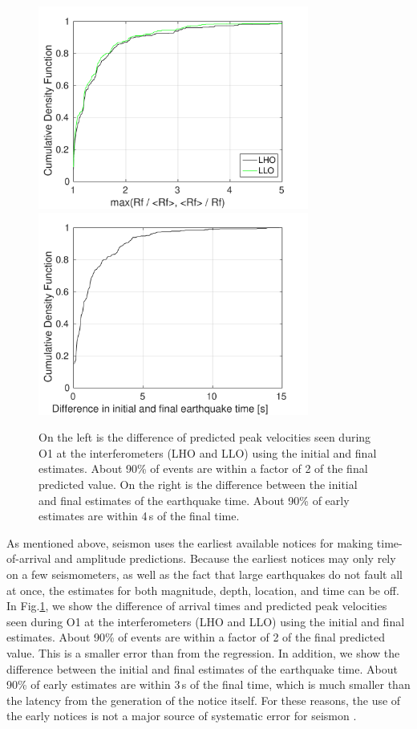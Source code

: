 \documentclass[reprint, prl, aps, showpacs]{revtex4-1}
\newcommand{\seismon}{\textnormal{seismon }}
\begin{document}
\begin{figure}[t]
\hspace*{-0.5cm}
 \includegraphics[width=3.5in]{initial_vs_final.pdf}
 \includegraphics[width=3.5in]{lockloss_est_timediff.pdf}
 \caption{On the left is the difference of predicted peak velocities seen during O1 at the interferometers (LHO and LLO) using the initial and final estimates. About 90\% of events are within a factor of 2 of the final predicted value. On the right is the difference between the initial and final estimates of the earthquake time. About 90\% of early estimates are within 4\,s of the final time.}
 \label{fig:initialvsfinal}
\end{figure}

As mentioned above, \seismon uses the earliest available notices for making time-of-arrival and amplitude predictions.
Because the earliest notices may only rely on a few seismometers, as well as the fact that large earthquakes do not fault all at once, the estimates for both magnitude, depth, location, and time can be off.
In Fig.\ref{fig:initialvsfinal}, we show the difference of arrival times and predicted peak velocities seen during O1 at the interferometers (LHO and LLO) using the initial and final estimates. About 90\% of events are within a factor of 2 of the final predicted value. This is a smaller error than from the regression.
In addition, we show the difference between the initial and final estimates of the earthquake time. About 90\% of early estimates are within 3\,s of the final time, which is much smaller than the latency from the generation of the notice itself.
For these reasons, the use of the early notices is not a major source of systematic error for \seismon.
\end{document}
